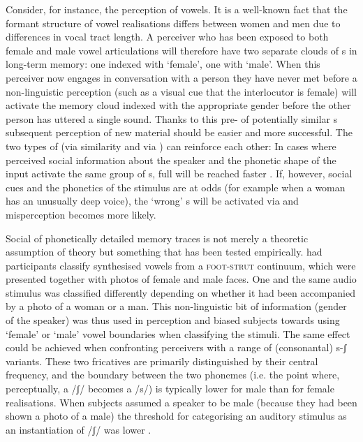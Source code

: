 Consider, for instance, the perception of vowels.
It is a well-known fact that the formant structure of vowel realisations differs between women and men due to differences in vocal tract length.
A perceiver who has been exposed to both female and male vowel articulations will therefore have two separate clouds of s in long-term memory: one indexed with `female', one with `male'.
When this perceiver now engages in conversation with a person they have never met before a non-linguistic perception (such as a visual cue that the interlocutor is female) will activate the memory cloud indexed with the appropriate gender before the other person has uttered a single sound.
Thanks to this pre- of potentially similar s subsequent perception of new material should be easier and more successful.
The two types of  (via similarity and via ) can reinforce each other: In cases where perceived social information about the speaker and the phonetic shape of the input activate the same group of s, full  will be reached faster \parencite[cf.][370--371]{hayetal2006a}.
If, however, social cues and the phonetics of the stimulus are at odds (for example when a woman has an unusually deep voice), the `wrong' s will be activated via  and misperception becomes more likely.

Social  of phonetically detailed memory traces is not merely a theoretic assumption of  theory but something that has been tested empirically.
\textcite{strandjohnson1996} had participants classify synthesised vowels from a \textsc{foot}-\textsc{strut} continuum, which were presented together with photos of female and male faces.
One and the same audio stimulus was classified differently depending on whether it had been accompanied by a photo of a woman or a man.
This non-linguistic bit of information (gender of the speaker) was thus used in perception and biased subjects towards using `female' or `male' vowel boundaries when classifying the stimuli.
The same effect could be achieved when confronting perceivers with a range of (consonantal) s-ʃ variants.
These two fricatives are primarily distinguished by their central frequency, and the boundary between the two phonemes (i.e. the point where, perceptually, a /ʃ/ becomes a /s/) is typically lower for male than for female realisations.
When subjects assumed a speaker to be male (because they had been shown a photo of a male) the threshold for categorising an auditory stimulus as an instantiation of /ʃ/ was lower \parencite[cf.][]{strandjohnson1996,strand1999}.

